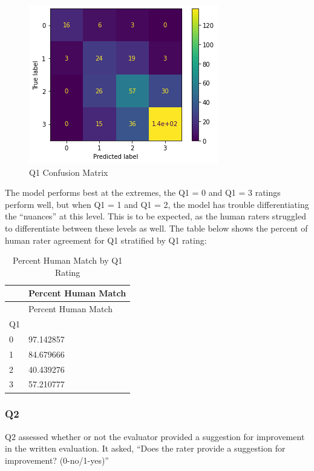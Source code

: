 \documentclass[
  letterpaper,
  DIV=11,
  numbers=noendperiod]{scrartcl}
\begin{document}
\begin{figure}

{\centering \includegraphics{results_lite_files/figure-pdf/fig-q1conf-output-1.png}

}

\caption{\label{fig-q1conf}Q1 Confusion Matrix}

\end{figure}

The model performs best at the extremes, the Q1 = 0 and Q1 = 3 ratings
perform well, but when Q1 = 1 and Q1 = 2, the model has trouble
differentiating the ``nuances'' at this level. This is to be expected,
as the human raters struggled to differentiate between these levels as
well. The table below shows the percent of human rater agreement for Q1
stratified by Q1 rating:

\hypertarget{tbl-q1humanmatch}{}
\begin{longtable}[]{@{}ll@{}}
\caption{\label{tbl-q1humanmatch}Percent Human Match by Q1
Rating}\tabularnewline
\toprule()
& Percent Human Match \\
\midrule()
\endfirsthead
\toprule()
& Percent Human Match \\
\midrule()
\endhead
Q1 & \\
0 & 97.142857 \\
1 & 84.679666 \\
2 & 40.439276 \\
3 & 57.210777 \\
\bottomrule()
\end{longtable}

\hypertarget{q2}{%
\subsubsection{Q2}\label{q2}}

Q2 assessed whether or not the evaluator provided a suggestion for
improvement in the written evaluation. It asked, ``Does the rater
provide a suggestion for improvement? (0-no/1-yes)''
\end{document}
